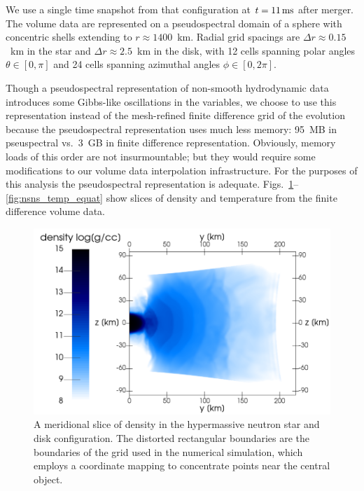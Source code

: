 \documentclass[aps,floatfix,prd,superscriptaddress,twocolumn]{revtex4-1}
\newcommand{\todo}[1]{\marginpar{\tiny{\textcolor{red}{#1}}}}
\renewcommand\todo[1]{} %
\begin{document}
We use a single time snapshot from that configuration
at $t=11\,{\rm ms}$ after merger.
The volume data are represented on a pseudospectral domain of a
sphere with concentric shells extending to $r\approx1400$~km.
Radial grid spacings are $\Delta r \approx 0.15$~km in the star
and $\Delta r \approx 2.5$~km in the disk,
with 12 cells spanning polar angles $\theta\in[0,\pi]$
and 24 cells spanning azimuthal angles $\phi\in[0,2\pi]$.
\todo{way too-low angular resolution}
Though a pseudospectral representation of non-smooth hydrodynamic data
introduces some Gibbs-like oscillations in the variables,
we choose to use this representation instead of the mesh-refined
finite difference grid of the evolution because the pseudospectral
representation uses much less memory:
95~MB in pseuspectral vs.\ 3~GB in finite difference representation.
Obviously, memory loads of this order are not insurmountable;
but they would require some modifications to our
volume data interpolation infrastructure.
For the purposes of this analysis the pseudospectral representation is adequate.
Figs.~\ref{fig:nsns_rho_merid}--\ref{fig:nsns_temp_equat}
show slices of density and temperature from the finite difference volume data.

\begin{figure}
  \includegraphics[width=\columnwidth]{production-colormap-merid-rho}
  \caption{A meridional slice of density in the hypermassive neutron
    star and disk configuration.
    The distorted rectangular boundaries are the boundaries of the grid
    used in the numerical simulation, which employs a coordinate mapping to
    concentrate points near the central object.}
  \label{fig:nsns_rho_merid}
\end{figure}
\end{document}
